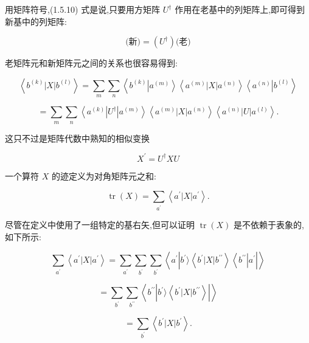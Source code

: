 \documentclass[lang=cn,newtx,10pt,scheme=chinese,thmcnt=section]{elegantbook}
\begin{document}
用矩阵符号,(1.5.10) 式是说,只要用方矩阵 ${U}^{ \dagger }$ 作用在老基中的列矩阵上,即可得到新基中的列矩阵:

$$
\text{(新)} = \left( {U}^{ \dagger }\right) \text{(老)} \tag{1.5.11}
$$

老矩阵元和新矩阵元之间的关系也很容易得到:

$$
\left\langle {{b}^{\left( k\right) }\left| X\right| {b}^{\left( l\right) }}\right\rangle = \mathop{\sum }\limits_{m}\mathop{\sum }\limits_{n}\left\langle {{b}^{\left( k\right) }\left| {a}^{\left( m\right) }\right\rangle \left\langle {{a}^{\left( m\right) }\left| X\right| {a}^{\left( n\right) }}\right\rangle \left\langle {a}^{\left( n\right) }\right| {b}^{\left( l\right) }}\right\rangle \tag{1.5.12}
$$

$$
= \mathop{\sum }\limits_{m}\mathop{\sum }\limits_{n}\left\langle {{a}^{\left( k\right) }\left| {U}^{ \dagger }\right| {a}^{\left( m\right) }}\right\rangle \left\langle {{a}^{\left( m\right) }\left| X\right| {a}^{\left( n\right) }}\right\rangle \left\langle {{a}^{\left( n\right) }\left| U\right| {a}^{\left( l\right) }}\right\rangle .
$$

这只不过是矩阵代数中熟知的相似变换

$$
{X}^{\prime } = {U}^{ \dagger }{XU} \tag{1.5.13}
$$

一个算符 $X$ 的迹定义为对角矩阵元之和:

$$
\operatorname{tr}\left( X\right) = \mathop{\sum }\limits_{{a}^{\prime }}\left\langle {{a}^{\prime }\left| X\right| {a}^{\prime }}\right\rangle . \tag{1. 5.14}
$$

尽管在定义中使用了一组特定的基右矢,但可以证明 $\operatorname{tr}\left( X\right)$ 是不依赖于表象的,如下所示:

$$
\mathop{\sum }\limits_{{a}^{\prime }}\left\langle {{a}^{\prime }\left| X\right| {a}^{\prime }}\right\rangle = \mathop{\sum }\limits_{{a}^{\prime }}\mathop{\sum }\limits_{{b}^{\prime }}\mathop{\sum }\limits_{{b}^{\prime }}\left\langle {{a}^{\prime }\left| {{b}^{\prime }\rangle \left\langle {{b}^{\prime }\left| X\right| {b}^{\prime \prime }}\right\rangle \left\langle {b}^{\prime \prime }\right| {a}^{\prime }}\right| }\right\rangle
$$

$$
= \mathop{\sum }\limits_{{b}^{\prime }}\mathop{\sum }\limits_{{b}^{\prime \prime }}\left\langle {{b}^{\prime \prime }\left| {{b}^{\prime }\rangle \left\langle {{b}^{\prime }\left| X\right| {b}^{\prime \prime }}\right\rangle }\right| }\right\rangle \tag{1.5.15}
$$

$$
= \mathop{\sum }\limits_{{b}^{\prime }}\left\langle {{b}^{\prime }\left| X\right| {b}^{\prime }}\right\rangle .
$$
\end{document}
